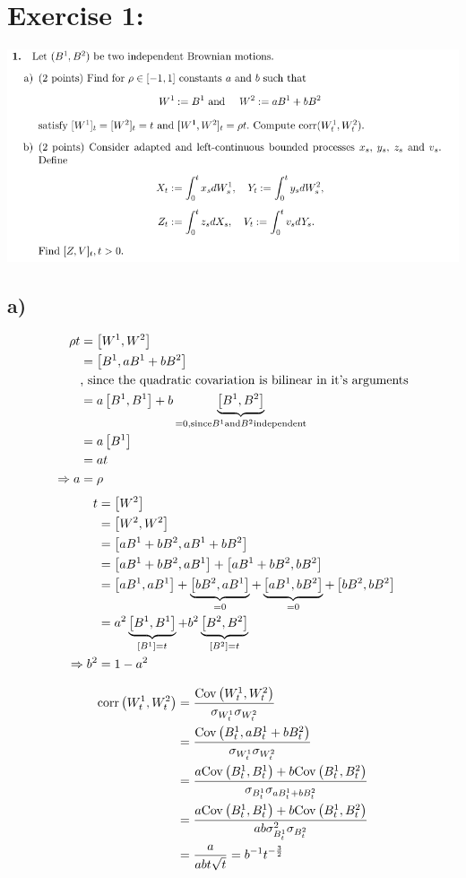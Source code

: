 \documentclass[document.tex]{subfiles}
\begin{document}
\section*{Exercise 1:}

\includegraphics[width=\textwidth]{ex1.png}

\subsection*{a)}
\begin{align*}
	\rho t &= \left[W^1 , W^2 \right] \\
	&= \left[B^1 , a B^1 + b B^2 \right] \\
	&\text{, since the quadratic covariation is bilinear in it's arguments}\\
	&= a \left[B^1 , B^1 \right] + b \underbrace{\left[B^1 , B^2 \right]}_{=0, \text{since} B^1 \text{and} B^2 \text{independent}} \\
	&= a \left[ B^1 \right] \\
	&= a t \\
\Rightarrow a &= \rho	 
\end{align*}
\begin{align*}
	t &= \left[ W^2 \right] \\
	&= \left[W^2 , W^2 \right]\\
	&= \left[a B^1 + b B^2 , a B^1 + b B^2 \right]\\
	&= \left[a B^1 + b B^2 , a B^1 \right] + \left[a B^1 + b B^2 , b B^2 \right]\\
	&= \left[aB^1 , aB^1 \right] + \underbrace{\left[bB^2 , aB^1 \right]}_{=0} + \underbrace{\left[aB^1 , bB^2 \right]}_{=0} + \left[bB^2 , bB^2 \right]\\
	&= a^2 \underbrace{\left[B^1 , B^1 \right]}_{\left[ B^1 \right]=t}+ b^2 \underbrace{\left[B^2 , B^2 \right]}_{\left[ B^2 \right]=t} \\
\Rightarrow	b^2 &= 1 - a^2
\end{align*}

\begin{align*}
	\mathrm{corr}\left(W^1_t , W^2_t\right) &= \frac{\mathrm{Cov}\left(W^1_t , W^2_t\right)}{\sigma_{W^1_t}\sigma_{W^2_t}}\\ 
	&= \frac{\mathrm{Cov}\left(B^1_t , aB^1_t + b B^2_t\right)}  {\sigma_{W^1_t}\sigma_{W^2_t}} \\
	&= \frac{a \mathrm{Cov}\left(B^1_t , B^1_t\right) + b\mathrm{Cov}\left(B^1_t , B^2_t\right)}{\sigma_{B^1_t} \sigma_{a B^1_t + b B^2_t}}\\
	&= \frac{a \mathrm{Cov}\left(B^1_t , B^1_t\right) + b\mathrm{Cov}\left(B^1_t , B^2_t\right)}{ a b \sigma_{B^1_t}^2 \sigma_{B^2_t}}\\
	&= \frac{a}{ a b t \sqrt{t}} = b^{-1} t^{-\frac{3}{2}}
\end{align*}
\end{document}
